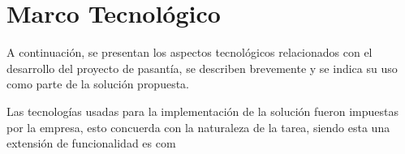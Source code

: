 \chapter{Marco Tecnológico}
\thispagestyle{empty} %

A continuación, se presentan los aspectos tecnológicos relacionados con el desarrollo del proyecto de pasantía, se describen brevemente y se indica su uso como parte de la solución propuesta.

Las tecnologías usadas para la implementación de la solución fueron impuestas por la empresa, esto concuerda con la naturaleza de la tarea, siendo esta una extensión de funcionalidad es com